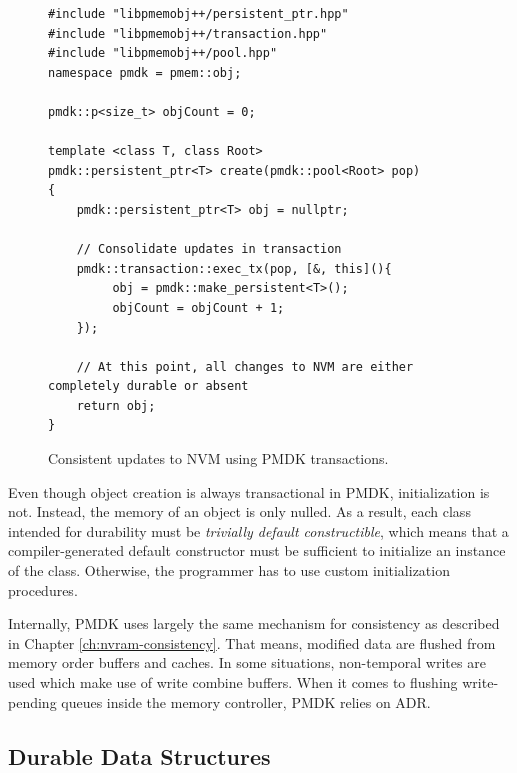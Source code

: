 \begin{figure}[h!]
\begin{lstlisting}
#include "libpmemobj++/persistent_ptr.hpp"
#include "libpmemobj++/transaction.hpp"
#include "libpmemobj++/pool.hpp"
namespace pmdk = pmem::obj;

pmdk::p<size_t> objCount = 0;

template <class T, class Root>
pmdk::persistent_ptr<T> create(pmdk::pool<Root> pop)
{
    pmdk::persistent_ptr<T> obj = nullptr;

    // Consolidate updates in transaction
    pmdk::transaction::exec_tx(pop, [&, this](){
         obj = pmdk::make_persistent<T>();
         objCount = objCount + 1;
    });

    // At this point, all changes to NVM are either completely durable or absent
    return obj;
}
\end{lstlisting}
\caption{Consistent updates to NVM using PMDK transactions.}
\label{lst:pmdk-tx}
\end{figure}

Even though object creation is always transactional in PMDK, initialization is
not. Instead, the memory of an object is only nulled. As a result, each class
intended for durability must be \emph{trivially default constructible}, which
means that a compiler-generated default constructor must be sufficient to
initialize an instance of the class. Otherwise, the programmer has to use custom
initialization procedures.

Internally, PMDK uses largely the same mechanism for consistency as described in
Chapter \ref{ch:nvram-consistency}. That means, modified data are flushed from
memory order buffers and caches. In some situations, non-temporal writes are
used which make use of write combine buffers. When it comes to flushing
write-pending queues inside the memory controller, PMDK relies on ADR.


\subsection{Durable Data Structures}
\label{ch:impl-data}


